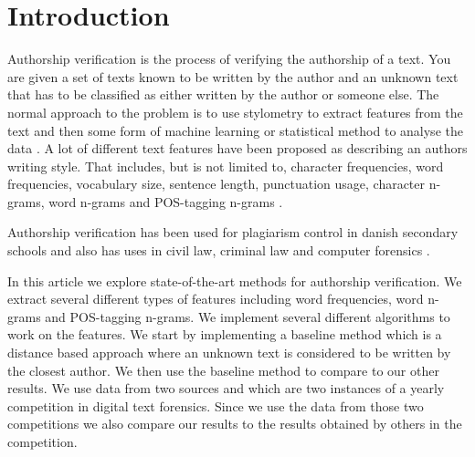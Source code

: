 \section{Introduction} \label{sec:introduction}
Authorship verification is the process of verifying the authorship of a text.
You are given a set of texts known to be written by the author and an unknown
text that has to be classified as either written by the author or someone else.
The normal approach to the problem is to use stylometry to extract features
from the text and then some form of machine learning or statistical method to
analyse the data \cite{stamatos2009}. A lot of different text features have
been proposed as describing an authors writing style. That includes, but is not
limited to, character frequencies, word frequencies, vocabulary size, sentence
length, punctuation usage, character n-grams, word n-grams and \gls{POS}-tagging
n-grams \cite{stamatos2009}.

Authorship verification has been used for plagiarism control in danish secondary
schools \cite{hansen2014} and also has uses in civil law, criminal law and
computer forensics \cite{stamatos2009}.

In this article we explore state-of-the-art methods for authorship verification.
We extract several different types of features including word frequencies, word
n-grams and \gls{POS}-tagging n-grams. We implement several different algorithms
to work on the features. We start by implementing a baseline method which is a
distance based approach where an unknown text is considered to be written by the
closest author. We then use the baseline method to compare to our other results.
We use data from two sources \cite{pan:2015} and \cite{pan:2013} which are two
instances of a yearly competition in digital text forensics. Since we use the
data from those two competitions we also compare our results to the results
obtained by others in the competition.

